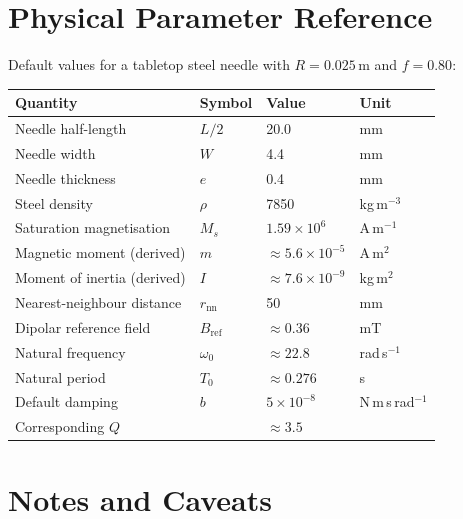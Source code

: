 \documentclass[11pt,a4paper]{article}
\begin{document}
\section{Physical Parameter Reference}
\label{sec:params}

Default values for a tabletop steel needle with $R = 0.025$\,m and
$f = 0.80$:

\begin{center}
\begin{tabular}{llll}
\toprule
Quantity & Symbol & Value & Unit \\
\midrule
Needle half-length & $L/2$ & 20.0 & mm \\
Needle width & $W$ & 4.4 & mm \\
Needle thickness & $e$ & 0.4 & mm \\
Steel density & $\rho$ & 7850 & kg\,m$^{-3}$ \\
Saturation magnetisation & $M_s$ & $1.59 \times 10^6$ & A\,m$^{-1}$ \\
Magnetic moment (derived) & $m$ & $\approx 5.6 \times 10^{-5}$ & A\,m$^2$ \\
Moment of inertia (derived) & $I$ & $\approx 7.6 \times 10^{-9}$ & kg\,m$^2$ \\
Nearest-neighbour distance & $r_{\mathrm{nn}}$ & 50 & mm \\
Dipolar reference field & $B_{\mathrm{ref}}$ & $\approx 0.36$ & mT \\
Natural frequency & $\omega_0$ & $\approx 22.8$ & rad\,s$^{-1}$ \\
Natural period & $T_0$ & $\approx 0.276$ & s \\
Default damping & $b$ & $5\times 10^{-8}$ & N\,m\,s\,rad$^{-1}$ \\
Corresponding $Q$ & & $\approx 3.5$ & \\
\bottomrule
\end{tabular}
\end{center}

\section{Notes and Caveats}
\label{sec:caveats}
\end{document}
